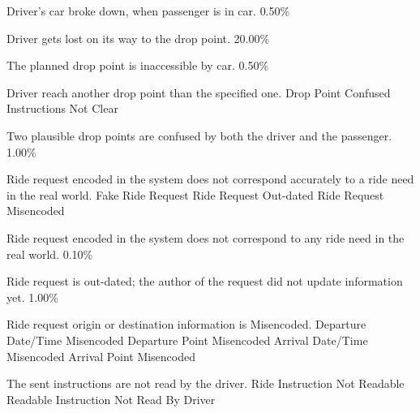   \startkaosspec
  	 {Driver’s car broke down, when passenger is in car.}
  	 {0.50\%}
  \stopkaosspec
  
  \startkaosspec
  	 {Driver gets lost on its way to the drop point.}
  	 {20.00\%}
  \stopkaosspec
  
  \startkaosspec
  	 {The planned drop point is inaccessible by car.}
  	 {0.50\%}
  \stopkaosspec
  
  \startkaosspec
  	 {Driver reach another drop point than the specified one.}
  	 {Drop Point Confused}
  	 {Instructions Not Clear}
  \stopkaosspec
  
  \startkaosspec
  	 {Two plausible drop points are confused by both the driver and the passenger.}
  	 {1.00\%}
  \stopkaosspec
  

    {}

  \startkaosspec
  	 {Ride request encoded in the system does not correspond accurately to a ride need in the real world.}
  	 {Fake Ride Request}
  	 {Ride Request Out-dated}
  	 {Ride Request Misencoded}
  \stopkaosspec

  \startkaosspec
  	 {Ride request encoded in the system does not correspond to any ride need in the real world.}
  	 {0.10\%}
  \stopkaosspec

  \startkaosspec
  	 {Ride request is out-dated; the author of the request did not update information yet.}
  	 {1.00\%}
  \stopkaosspec

  \startkaosspec
  	 {Ride request origin or destination information is Misencoded.}
  	 {Departure Date/Time Misencoded}
  	 {Departure Point Misencoded}
  	 {Arrival Date/Time Misencoded}
  	 {Arrival Point Misencoded}
  \stopkaosspec

  \startkaosspec
  	 {The sent instructions are not read by the driver.}
  	 {Ride Instruction Not Readable}
  	 {Readable Instruction Not Read By Driver}
  \stopkaosspec

\stopsubsection